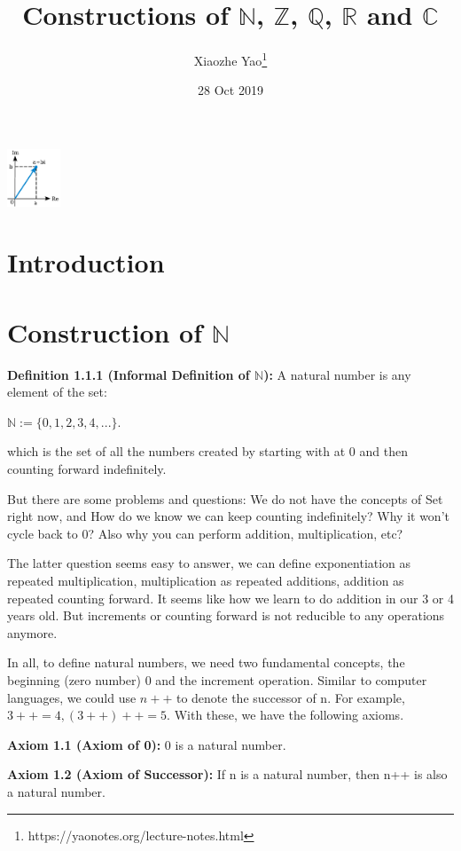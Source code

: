 \documentclass{article}
\title{Constructions of $\mathbb{N}$, $\mathbb{Z}$, $\mathbb{Q}$, $\mathbb{R}$ and $\mathbb{C}$}
\author{Xiaozhe Yao\footnote{https://yaonotes.org/lecture-notes.html}}
\date{28 Oct 2019}
\theoremstyle{definition}
\begin{document}
\maketitle
\begin{center}
    \includegraphics[width=60px]{Analysis/images/complex-number.pdf}
\end{center}

\section{Introduction}


\section{Construction of $\mathbb{N}$}

\noindent\textbf{Definition 1.1.1 (Informal Definition of $\mathbb{N}$):} A natural number is any element of the set:

$\mathbb{N} := \{0,1,2,3,4,...\}$.

which is the set of all the numbers created by starting with at $0$ and then counting forward indefinitely.

But there are some problems and questions: We do not have the concepts of Set right now, and How do we know we can keep counting indefinitely? Why it won't cycle back to $0$? Also why you can perform addition, multiplication, etc?

The latter question seems easy to answer, we can define exponentiation as repeated multiplication, multiplication as repeated additions, addition as repeated counting forward. It seems like how we learn to do addition in our 3 or 4 years old. But increments or counting forward is not reducible to any operations anymore.

In all, to define natural numbers, we need two fundamental concepts, the beginning (zero number) $0$ and the increment operation. Similar to computer languages, we could use $n++$ to denote the successor of n. For example, $3++ = 4, (3++)++ = 5$. With these, we have the following axioms.

\noindent\textbf{Axiom 1.1 (Axiom of 0):} 0 is a natural number.

\noindent\textbf{Axiom 1.2 (Axiom of Successor):} If n is a natural number, then n++ is also a natural number.
\end{document}
